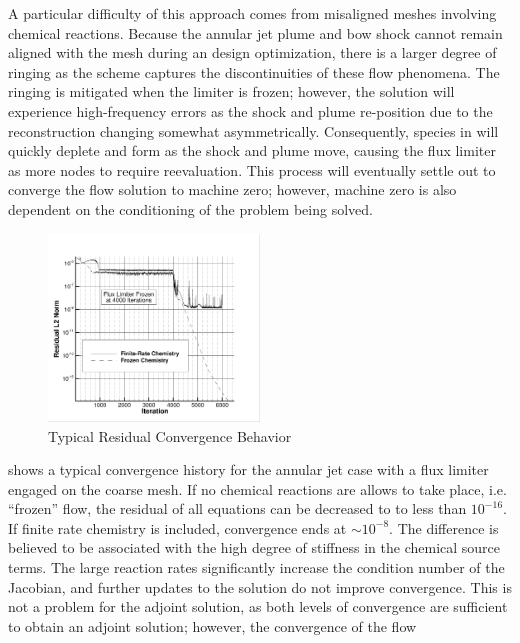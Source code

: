 A particular difficulty of this approach comes from misaligned meshes involving
chemical reactions.  Because the annular jet plume and bow shock cannot remain
aligned with the mesh during an design optimization, there is a larger degree of
ringing as the scheme captures the discontinuities of these flow phenomena.  The
ringing is mitigated when the limiter is frozen; however, the solution will
experience high-frequency errors as the shock and plume re-position due to the
reconstruction changing somewhat asymmetrically.  Consequently, species in will
quickly deplete and form as the shock and plume move, causing the flux limiter
as more nodes to require reevaluation.  This process will eventually settle out
to converge the flow solution to machine zero; however, machine zero is also
dependent on the conditioning of the problem being solved.  
\begin{figure}[h]
  \centering
  \includegraphics[width=0.5\textwidth]{figures/limiters/chem-res-comp.png}
  \caption{Typical Residual Convergence Behavior}
  \label{fig:chem-res-comp}
\end{figure}
 shows a typical convergence history for the annular jet
case with a flux limiter engaged on the coarse mesh.  If no chemical reactions
are allows to take place, i.e. ``frozen'' flow, the residual of all equations
can be decreased to to less than $10^{-16}$.  If finite rate chemistry is
included, convergence ends at $\sim 10^{-8}$.  The difference is believed to be
associated with the high degree of stiffness in the chemical source terms.  The
large reaction rates significantly increase the condition number of the
Jacobian, and further updates to the solution do not improve convergence.  This
is not a problem for the adjoint solution, as both levels of convergence are
sufficient to obtain an adjoint solution; however, the convergence of the flow

